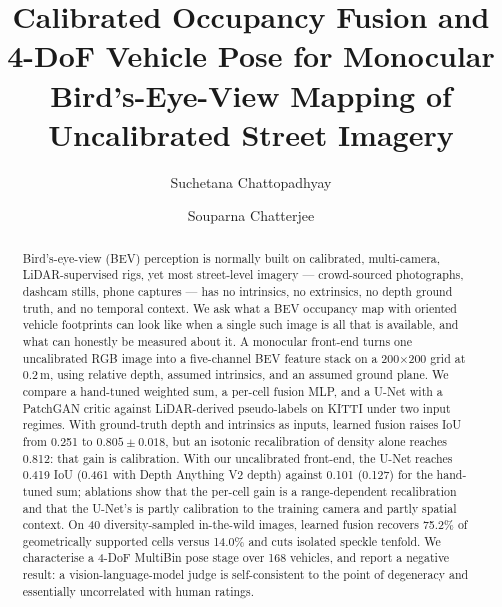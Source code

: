 \documentclass[sigconf]{acmart}
\begin{document}
\title{Calibrated Occupancy Fusion and 4-DoF Vehicle Pose for Monocular Bird's-Eye-View Mapping of Uncalibrated Street Imagery}

\author{Suchetana Chattopadhyay}

\author{Souparna Chatterjee}

\renewcommand{\shortauthors}{Chattopadhyay and Chatterjee}

\begin{abstract}
Bird's-eye-view (BEV) perception is normally built on calibrated, multi-camera, LiDAR-supervised rigs, yet most street-level imagery --- crowd-sourced photographs, dashcam stills, phone captures --- has no intrinsics, no extrinsics, no depth ground truth, and no temporal context. We ask what a BEV occupancy map with oriented vehicle footprints can look like when a single such image is all that is available, and what can honestly be measured about it. A monocular front-end turns one uncalibrated RGB image into a five-channel BEV feature stack on a 200$\times$200 grid at 0.2\,m, using relative depth, assumed intrinsics, and an assumed ground plane. We compare a hand-tuned weighted sum, a per-cell fusion MLP, and a U-Net with a PatchGAN critic against LiDAR-derived pseudo-labels on KITTI under two input regimes. With ground-truth depth and intrinsics as inputs, learned fusion raises IoU from 0.251 to $0.805\pm0.018$, but an isotonic recalibration of density alone reaches 0.812: that gain is calibration. With our uncalibrated front-end, the U-Net reaches 0.419 IoU (0.461 with Depth Anything V2 depth) against 0.101 (0.127) for the hand-tuned sum; ablations show that the per-cell gain is a range-dependent recalibration and that the U-Net's is partly calibration to the training camera and partly spatial context. On 40 diversity-sampled in-the-wild images, learned fusion recovers 75.2\% of geometrically supported cells versus 14.0\% and cuts isolated speckle tenfold. We characterise a 4-DoF MultiBin pose stage over 168 vehicles, and report a negative result: a vision-language-model judge is self-consistent to the point of degeneracy and essentially uncorrelated with human ratings.
\end{abstract}
\end{document}
